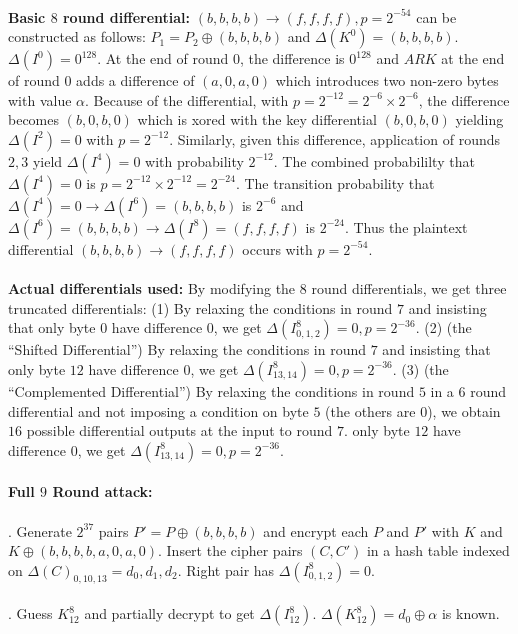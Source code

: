 \\
{\bf Basic $8$ round differential:} $(b,b,b,b) \rightarrow (f,f,f,f), p= 2^{-54}$ can
be constructed as follows: $P_1= P_2 \oplus (b,b,b,b)$ and $\Delta(K^0)= (b,b,b,b)$.
$\Delta(I^0)= 0^{128}$.  At the end of round 0, the difference is $0^{128}$ and $ARK$
at the end of round $0$ adds a difference of $(a,0,a,0)$ which introduces two non-zero
bytes with value $\alpha$.  Because of the differential, with $p=2^{-12}=2^{-6} \times 2^{-6}$,
the difference becomes $(b,0,b,0)$ which is xored with the key differential $(b,0,b,0)$ yielding
$\Delta(I^2)=0$ with $p=2^{-12}$.  Similarly, given this difference, application of
rounds $2,3$ yield $\Delta(I^4)=0$ with probability $2^{-12}$.  The combined probabililty
that 
$\Delta(I^4)=0$ is $p= 2^{-12} \times 2^{-12}= 2^{-24}$.  The transition probability that
$\Delta(I^4)=0 \rightarrow \Delta(I^6)=(b,b,b,b)$ is $2^{-6}$ and
$\Delta(I^6)=(b,b,b,b) \rightarrow \Delta(I^8)=(f,f,f,f)$ is $2^{-24}$.  Thus
the plaintext differential 
$(b,b,b,b) \rightarrow (f,f,f,f)$ occurs with $p=2^{-54}$.
\\
\\
{\bf Actual differentials used:}  By modifying the $8$ round differentials, we get three
truncated differentials: 
(1) By relaxing the conditions in round $7$ and insisting that
only byte $0$ have difference $0$, we get $\Delta(I^8_{0,1,2})=0, p=2^{-36}$.
(2) (the ``Shifted Differential'') By relaxing the conditions in round $7$ and insisting that
only byte $12$ have difference $0$, we get $\Delta(I^8_{13,14})=0, p=2^{-36}$.
(3) (the ``Complemented Differential'') By relaxing the conditions in round $5$ in a $6$
round differential and not imposing a condition on byte $5$ (the others are $0$), we obtain
$16$ possible differential outputs at the input to round $7$.
only byte $12$ have difference $0$, we get $\Delta(I^8_{13,14})=0, p=2^{-36}$.
\\
\\
{\bf Full $9$ Round attack:}
\\
\\
. Generate $2^{37}$ pairs $P'=P \oplus (b,b,b,b)$ and encrypt each $P$ and $P'$ with
$K$ and $K \oplus (b,b,b,b,a,0,a,0)$.  Insert the cipher pairs $(C, C')$ in a hash
table indexed on $\Delta(C)_{0, 10, 13}= {d_0, d_1, d_2}$.  Right pair has
$\Delta(I^{8}_{0,1,2})= 0$.
\\
\\
. Guess $K_{12}^8$ and partially decrypt to get $\Delta(I^8_{12})$.  
$\Delta(K^8_{12})= d_0 \oplus \alpha$ is known.
